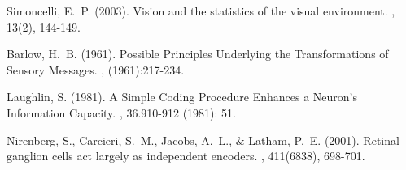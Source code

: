 \documentclass[twoside]{article}
\begin{document}
\begin{multicols}{2}
\begin{thebibliography}{99} 

Simoncelli, E.~P. (2003).
\newblock  Vision and the statistics of the visual environment.
, 13(2), 144-149.

Barlow, H.~B. (1961).
\newblock Possible Principles Underlying the Transformations of Sensory Messages.
, (1961):217-234.


Laughlin, S. (1981).
\newblock A Simple Coding Procedure Enhances a Neuron's Information Capacity.
, 36.910-912 (1981): 51.

Nirenberg, S., Carcieri, S.~M., Jacobs, A.~L., \& Latham, P.~E. (2001).
\newblock Retinal ganglion cells act largely as independent encoders.
, 411(6838), 698-701.
 
\end{thebibliography}



\end{multicols}
\end{document}
